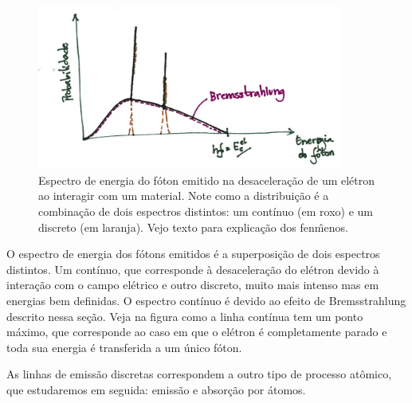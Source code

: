 \documentclass{article}
\begin{document}
\begin{figure}[ht]
\includegraphics[width=0.9\textwidth]{brem.png}
\caption{\label{fig:brem}Espectro de energia do f\'oton emitido na desacelera\c c\~ao de um el\'etron ao interagir com um material. Note como a distribui\c c\~ao \'e a combina\c c\~ao de dois espectros distintos: um cont\'inuo (em roxo) e um discreto (em laranja). Vejo texto para explica\c c\~ao dos fen\^menos.}
\end{figure}
O espectro de energia dos f\'otons emitidos \'e a superposi\c c\~ao de dois espectros distintos. Um cont\'inuo, que corresponde \`a desacelera\c c\~ao do el\'etron devido \`a intera\c c\~ao com o campo el\'etrico e outro discreto, muito mais intenso mas em energias bem definidas. O espectro cont\'inuo \'e devido ao efeito de Bremsstrahlung descrito nessa se\c c\~ao. Veja na figura como a linha cont\'inua tem um ponto m\'aximo, que corresponde ao caso em que o el\'etron \'e completamente parado e toda sua energia \'e transferida a um \'unico f\'oton.

As linhas de emiss\~ao discretas correspondem a outro tipo de processo at\^omico, que estudaremos em seguida: emiss\~ao e absor\c c\~ao por \'atomos.
\end{document}
